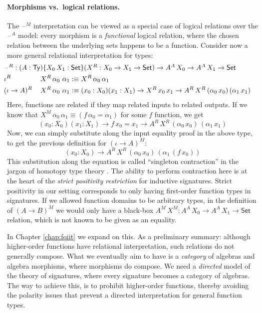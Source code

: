 \documentclass[12pt,a4paper,twoside,openany]{book}
\theoremstyle{remark}
\theoremstyle{definition}
\theoremstyle{theorem}
\newcommand{\Ty}{\mathsf{Ty}}
\newcommand{\blank}{\mathord{\hspace{1pt}\text{--}\hspace{1pt}}}
\newcommand{\Set}{\mathsf{Set}}
\newcommand{\defn}{:\equiv}
\begin{document}
\paragraph{Morphisms vs.\ logical relations.}
The $\blank^M$ interpretation can be viewed as a special case of logical
relations over the $\blank^A$ model: every morphism is a \emph{functional}
logical relation, where the chosen relation between the underlying sets happens
to be a function. Consider now a more general relational interpretation for
types:
\begin{alignat*}{3}
  & \hspace{-0.5em}\rlap{$\blank^R : (A : \Ty)\{X_0\,X_1 : \Set\}(X^R : X_0 \to X_1 \to \Set) \to A^A\,X_0 \to A^A\,X_1 \to \Set$}\\
  & \hspace{-0.5em}\iota^R\,&&X^R\,\alpha_0\,\,\alpha_1 \defn X^R\,\alpha_0\,\alpha_1 \\
  & \hspace{-0.5em}(\iota\to A)^R\,&&X^R\,\alpha_0\,\,\alpha_1 \defn
       (x_0 : X_0)(x_1 : X_1) \to X^R\,x_0\,x_1 \to A^R\,X^R\,(\alpha_0\,x_0)\,(\alpha_1\,x_1)
\end{alignat*}
Here, functions are related if they map related inputs to related outputs. If we
know that $X^M\,\alpha_0\,\alpha_1 \equiv (f\,\alpha_0 = \alpha_1)$ for some $f$
function, we get
\[
  (x_0 : X_0)(x_1 : X_1) \to f\,x_0 = x_1 \to A^R\,X^R\,(\alpha_0\,x_0)\,(\alpha_1\,x_1)
\]
Now, we can simply substitute along the input equality proof in the above type,
to get the previous definition for $(\iota \to A)^M$:
\[
  (x_0 : X_0) \to A^R\,X^R\,(\alpha_0\,x_0)\,(\alpha_1\,(f\,x_0))
\]
This substitution along the equation is called ``singleton contraction'' in the
jargon of homotopy type theory \cite{hottbook}. The ability to perform contraction
here is at the heart of the \emph{strict positivity restriction} for inductive
signatures. Strict positivity in our setting corresponds to only having
first-order function types in signatures. If we allowed function domains to be
arbitrary types, in the definition of $(A \to B)^M$ we would only have a
black-box $A^M\,X^M : A^A\,X_0 \to A^A\,X_1 \to \Set$ relation, which is not
known to be given as an equality.

In Chapter \ref{chap:fqiit} we expand on this. As a preliminary summary:
although higher-order functions have relational interpretation, such relations
do not generally compose. What we eventually aim to have is a \emph{category} of
algebras and algebra morphisms, where morphisms do compose. We need a
\emph{directed} model of the theory of signatures, where every signature becomes
a category of algebras. The way to achieve this, is to prohibit higher-order
functions, thereby avoiding the polarity issues that prevent a directed
interpretation for general function types.
\end{document}
